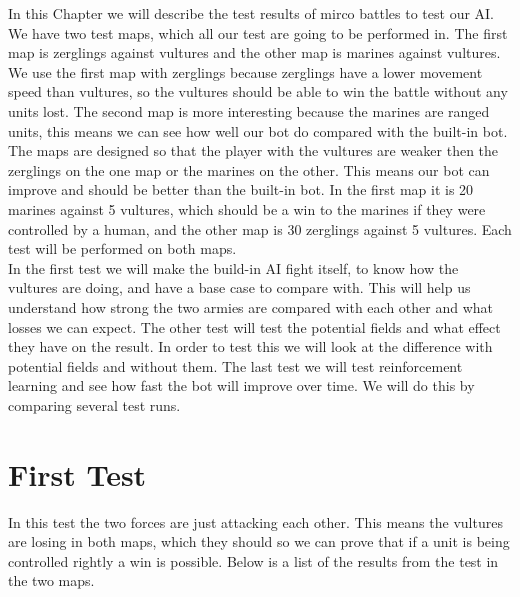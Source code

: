 In this Chapter we will describe the test results of mirco battles to test our AI. We have two test maps, which all our test are going to be performed in. The first map is  zerglings against vultures and the other map is marines against vultures. We use the first map with zerglings because zerglings have a lower movement speed than vultures, so the vultures should be able to win the battle without any units lost. The second map is more interesting because the marines are ranged units, this means we can see how well our bot do compared with the built-in bot. The maps are  designed so that the player with the vultures are weaker then the zerglings on the one map or the marines on the other. This means our bot can improve and should be better than the built-in bot. In the first map it is 20 marines against 5 vultures, which should be a win to the marines if they were controlled by a human, and the other map is 30 zerglings against 5 vultures. Each test will be performed on both maps. \\

In the first test we will make the build-in AI fight itself, to know how the vultures are doing, and have a base case to compare with. This will help us understand how strong the two armies are compared with each other and what losses we can expect. The other test will test the potential fields and what effect they have on the result.
In order to test this we will look at the difference with potential fields and without them. The last test we will test reinforcement learning and see how fast the bot will improve over time. We will do this by comparing several test runs.

\section{First Test} %
In this test the two forces are just attacking each other. This means the vultures are losing in both maps, which they should so we can prove that if a unit is being controlled rightly a win is possible. Below is a list of the results from the test
in the two maps.

